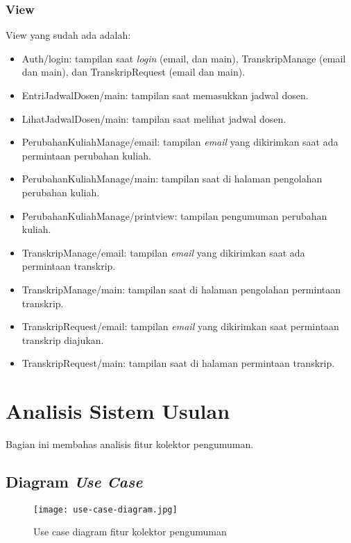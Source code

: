 \subsubsection{View}
View yang sudah ada adalah:
\begin{itemize}
	\item Auth/login: tampilan saat \textit{login} (email, dan main), TranskripManage (email dan main), dan TranskripRequest (email dan main).
	\item EntriJadwalDosen/main: tampilan saat memasukkan jadwal dosen.
	\item LihatJadwalDosen/main: tampilan saat melihat jadwal dosen.
	\item PerubahanKuliahManage/email: tampilan \textit{email} yang dikirimkan saat ada permintaan perubahan kuliah.
	\item PerubahanKuliahManage/main: tampilan saat di halaman pengolahan perubahan kuliah.
	\item PerubahanKuliahManage/printview: tampilan pengumuman perubahan kuliah.
	\item TranskripManage/email: tampilan \textit{email} yang dikirimkan saat ada permintaan transkrip.
	\item TranskripManage/main: tampilan saat di halaman pengolahan permintaan transkrip.
	\item TranskripRequest/email: tampilan \textit{email} yang dikirimkan saat permintaan transkrip diajukan.
	\item TranskripRequest/main: tampilan saat di halaman permintaan transkrip.
\end{itemize} 

\section{Analisis Sistem Usulan}
\label{sec:analisisYangDibangun}
	Bagian ini membahas analisis fitur kolektor pengumuman.

\subsection{Diagram \textit{Use Case}}
\begin{figure}[H]
	\centering  
	\texttt{[image: use-case-diagram.jpg]}  
	\caption[Use case diagram fitur kolektor pengumuman]{Use case diagram fitur kolektor pengumuman} 
	\label{fig:use-case-diagram} 
\end{figure}

